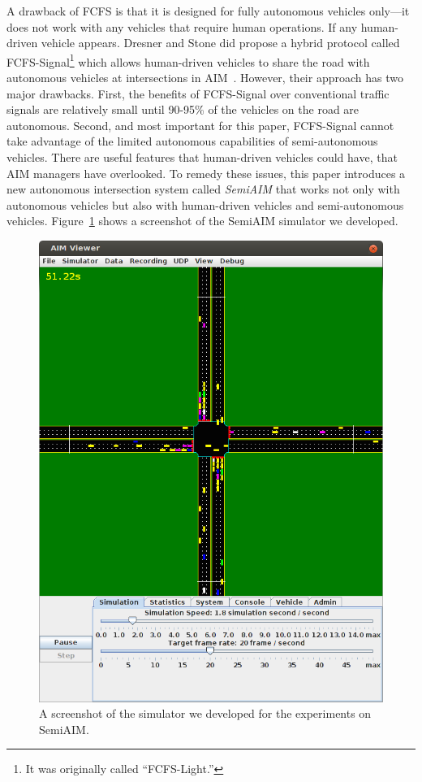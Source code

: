 A drawback of FCFS is that it is designed for fully autonomous
vehicles only---it does not work with any vehicles that require
human operations. If any human-driven vehicle
appears. Dresner and Stone did propose a hybrid protocol called
FCFS-Signal\footnote{It was originally called ``FCFS-Light.''} which
allows human-driven vehicles to share the road with autonomous
vehicles at intersections in AIM~\cite{bib:Dresner07Sharing}. However,
their approach has two major drawbacks.  First, the benefits of
FCFS-Signal over conventional traffic signals are relatively small
until 90-95\% of the vehicles on the road are autonomous.  Second, and
most important for this paper, FCFS-Signal cannot take advantage of
the limited autonomous capabilities of semi-autonomous vehicles. There
are useful features that human-driven vehicles could have, that AIM
managers have overlooked. To remedy these issues, this paper
introduces a new autonomous intersection system called \emph{SemiAIM}
that works not only with autonomous vehicles but also with
human-driven vehicles and semi-autonomous vehicles.
Figure~\ref{fig:demo} shows a screenshot of the SemiAIM simulator
we developed. 

\begin{figure}
\centering
\includegraphics[width=0.8\columnwidth]{figures/demo.png}
\caption{A screenshot of the simulator we developed for the experiments on
SemiAIM.}
\label{fig:demo}
\end{figure}

